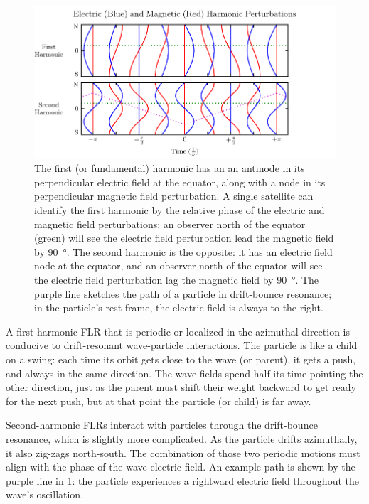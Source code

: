\begin{figure}[!htb]
    \centering
    \includegraphics[width=\textwidth]{figures/harmonics.pdf}
    \caption[First and Second Harmonic Resonances]{
      The first (or fundamental) harmonic has an an antinode in its perpendicular electric field at the equator, along with a node in its perpendicular magnetic field perturbation. A single satellite can identify the first harmonic by the relative phase of the electric and magnetic field perturbations: an observer north of the equator (green) will see the electric field perturbation lead the magnetic field by \SI{90}{\degree}. The second harmonic is the opposite: it has an electric field node at the equator, and an observer north of the equator will see the electric field perturbation lag the magnetic field by \SI{90}{\degree}. The purple line sketches the path of a particle in drift-bounce resonance; in the particle's rest frame, the electric field is always to the right. 
    }
    \label{fig_harmonics}
\end{figure}

A first-harmonic FLR that is periodic or localized in the azimuthal direction is conducive to drift-resonant wave-particle interactions\cite{dai_2013,poulter_1983}. The particle is like a child on a swing: each time its orbit gets close to the wave (or parent), it gets a push, and always in the same direction. The wave fields spend half its time pointing the other direction, just as the parent must shift their weight backward to get ready for the next push, but at that point the particle (or child) is far away. 

Second-harmonic FLRs interact with particles through the drift-bounce resonance, which is slightly more complicated. As the particle drifts azimuthally, it also zig-zags north-south. The combination of those two periodic motions must align with the phase of the wave electric field. An example path is shown by the purple line in \cref{fig_harmonics}: the particle experiences a rightward electric field throughout the wave's oscillation. 

